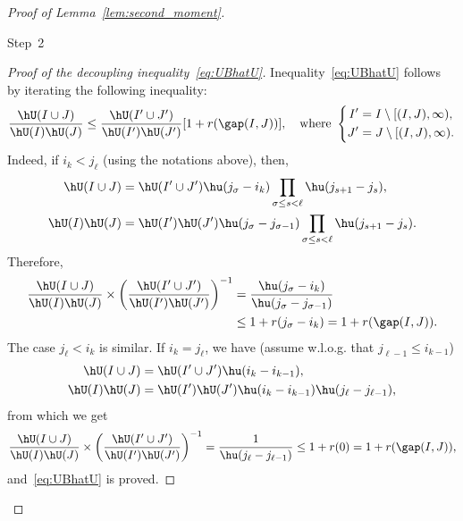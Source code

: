 \begin{proof}[Proof of Lemma~\ref{lem:second_moment}]
\begin{step}{Step~2}
\begin{proof}[Proof of the decoupling inequality~\eqref{eq:UBhatU}]
Inequality~\eqref{eq:UBhatU} follows by iterating the following inequality:
\begin{equation}
\frac{\hU(I \cup J)}{\hU(I) \hU(J)} \leq \frac{\hU(I' \cup J')}{\hU(I') \hU(J')}[1 + r(\gap(I,J))], \quad \text{where }\left\{
\begin{aligned}
I'&= I \setminus [(I,J),\infty),\\
J'&= J \setminus [(I,J),\infty).
\end{aligned}
\right.
\end{equation}
Indeed, if $i_k < j_\ell$ (using the notations above), then,
\begin{equation}
\begin{aligned}
\hU(I \cup J) &= \hU(I' \cup J') \hu(j_\sigma - i_k) \prod_{\sigma \leq s < \ell} \hu(j_{s+1}-j_s),\\
\hU(I)\hU(J) &= \hU(I')\hU(J') \hu(j_\sigma - j_{\sigma-1}) \prod_{\sigma \leq s < \ell} \hu(j_{s+1}-j_s).
\end{aligned}
\end{equation}
Therefore,
\begin{equation}
\begin{aligned}
\frac{\hU(I \cup J)}{\hU(I) \hU(J)} \times \left(\frac{\hU(I' \cup J')}{\hU(I') \hU(J')} \right)^{-1} &= \frac{\hu(j_\sigma - i_k)}{\hu(j_\sigma - j_{\sigma-1})}\\
& \leq 1 + r(j_\sigma - i_k) = 1 + r(\gap(I,J)).
\end{aligned}
\end{equation}
The case $j_\ell < i_k$ is similar. If $i_k = j_\ell$, we have (assume w.l.o.g. that $j_{\ell-1} \leq i_{k-1}$)
\begin{equation}
\begin{aligned}
\hU(I \cup J) &= \hU(I' \cup J') \hu(i_k - i_{k-1}),\\
\hU(I) \hU(J) &= \hU(I') \hU(J') \hu(i_k - i_{k-1}) \hu(j_\ell - j_{\ell-1}),
\end{aligned}
\end{equation}
from which we get
\begin{equation}
\frac{\hU(I \cup J)}{\hU(I) \hU(J)} \times \left(\frac{\hU(I' \cup J')}{\hU(I') \hU(J')} \right)^{-1} = \frac{1}{\hu(j_\ell - j_{\ell-1})} \leq 1 + r(0) = 1 + r(\gap(I,J)),
\end{equation}
and~\eqref{eq:UBhatU} is proved.
\end{proof}
\end{step}


\end{proof}
